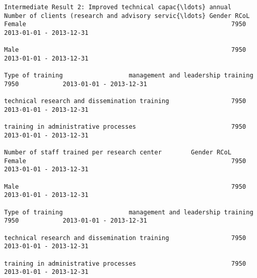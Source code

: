 \documentclass[11pt]{article}
\begin{document}
\begin{Verbatim}[commandchars=\\\{\}]
          Intermediate Result 2: Improved technical capac{\ldots} annual      Number of clients (research and advisory servic{\ldots} Gender RCoL                       Female                                                        7950            2013-01-01 - 2013-12-31   
                                                                                                                                                              Male                                                          7950            2013-01-01 - 2013-12-31   
                                                                                                                            Type of training                  management and leadership training                            7950            2013-01-01 - 2013-12-31   
                                                                                                                                                              technical research and dissemination training                 7950            2013-01-01 - 2013-12-31   
                                                                                                                                                              training in administrative processes                          7950            2013-01-01 - 2013-12-31   
                                                                         Number of staff trained per research center        Gender RCoL                       Female                                                        7950            2013-01-01 - 2013-12-31   
                                                                                                                                                              Male                                                          7950            2013-01-01 - 2013-12-31   
                                                                                                                            Type of training                  management and leadership training                            7950            2013-01-01 - 2013-12-31   
                                                                                                                                                              technical research and dissemination training                 7950            2013-01-01 - 2013-12-31   
                                                                                                                                                              training in administrative processes                          7950            2013-01-01 - 2013-12-31   

\end{Verbatim}
\end{document}
